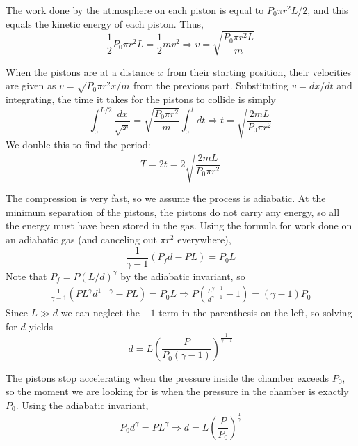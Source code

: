\documentclass[11pt]{scrartcl}
\begin{document}
\begin{sol}
    \begin{anum}
        \item The work done by the atmosphere on each piston is equal to $P_0\pi r^2L/2$, and this equals the kinetic energy of each piston. Thus, $$\frac12P_0\pi r^2L=\frac12mv^2\Rightarrow v=\boxed{\sqrt{\frac{P_0\pi r^2L}{m}}}$$
        \item When the pistons are at a distance $x$ from their starting position, their velocities are given as $v=\sqrt{{P_0\pi r^2x}/{m}}$ from the previous part. Substituting $v=dx/dt$ and integrating, the time it takes for the pistons to collide is simply $$\int_0^{L/2}\frac{dx}{\sqrt x}=\sqrt{\frac{P_0\pi r^2}{m}}\int_0^tdt\Rightarrow t=\sqrt{\frac{2mL}{P_0\pi r^2}}$$We double this to find the period: $$T=2t=\boxed{2\sqrt{\frac{2mL}{P_0\pi r^2}}}$$
        \item The compression is very fast, so we assume the process is adiabatic. At the minimum separation of the pistons, the pistons do not carry any energy, so all the energy must have been stored in the gas. Using the formula for work done on an adiabatic gas (and canceling out $\pi r^2$ everywhere), $$\frac{1}{\gamma-1}(P_fd-PL)=P_0L$$Note that $P_f=P(L/d)^\gamma$ by the adiabatic invariant, so \begin{align*}
            \frac{1}{\gamma-1}(PL^\gamma d^{1-\gamma}-PL)=P_0L\Rightarrow P\left(\frac{L^{\gamma-1}}{d^{\gamma-1}}-1\right)=(\gamma-1)P_0
        \end{align*}Since $L\gg d$ we can neglect the $-1$ term in the parenthesis on the left, so solving for $d$ yields $$d=\boxed{L\left(\frac{P}{P_0(\gamma-1)}\right)^{\frac{1}{\gamma-1}}}$$
        \item The pistons stop accelerating when the pressure inside the chamber exceeds $P_0$, so the moment we are looking for is when the pressure in the chamber is exactly $P_0$. Using the adiabatic invariant, $$P_0d^\gamma=PL^\gamma\Rightarrow d=\boxed{L\left(\frac{P}{P_0}\right)^{\frac 1\gamma}}$$
    \end{anum}
\end{sol}
\end{document}
